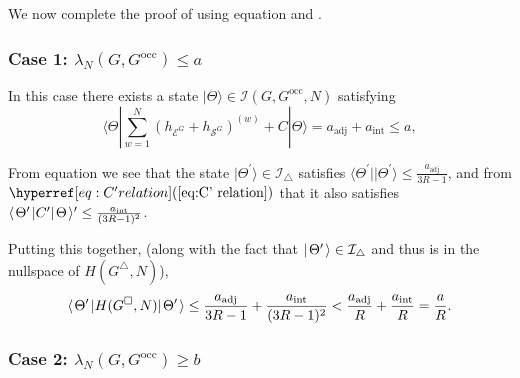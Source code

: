 \documentclass[../thesis-main/thesis-main]{subfiles}
\begin{document}
We now complete the proof of  using equation  and .

\subsubsection*{Case 1: $\lambda_{N}(G,G^{\text{occ}})\leq a$}

In this case there exists a state $|\Theta\rangle\in\mathcal{I}(G,G^{\text{occ}},N)$ satisfying 
\begin{equation}
\langle\Theta|\sum_{w=1}^{N}\left(h_{\mathcal{E}^{G}}+h_{\mathcal{S}^{G}}\right)^{(w)} + C|\Theta\rangle = a_{\text{adj}} + a_\text{int}\leq a,
\end{equation}

From equation  we see that the state $|\Theta^{\prime}\rangle\in\mathcal{I}_{\triangle}$ satisfies $\langle\Theta^{\prime}||\Theta^{\prime}\rangle\leq\frac{a_{\text{adj}}}{3R-1}$, and from $\eq{C' relation}$ that it also satisfies $\langle\mspace{2mu} \Theta' \mspace{2mu} | C' |\mspace{2mu} \Theta \mspace{2mu} \rangle' \leq \frac{a_{\text{int}}}{(3R-1)^2}$.

Putting this together, (along with the fact that $|\mspace{2mu} \Theta' \mspace{2mu} \rangle\in \mathcal{I}_{\triangle}$ and thus is in the nullspace of $H(G^{\triangle},N)$),
\begin{equation}
  \langle\mspace{2mu} \Theta' \mspace{2mu} |H(G^{\square},N) |\mspace{2mu} \Theta' \mspace{2mu} \rangle \leq \frac{a_{\text{adj}}}{3R-1} + \frac{a_{\text{int}}}{(3R-1)^2} < \frac{a_{\text{adj}}}{R} + \frac{a_{\text{int}}}{R} = \frac{a}{R}.
\end{equation}

\subsubsection*{Case 2: $\lambda_{N}(G,G^{\text{occ}})\geq b$}
\end{document}
